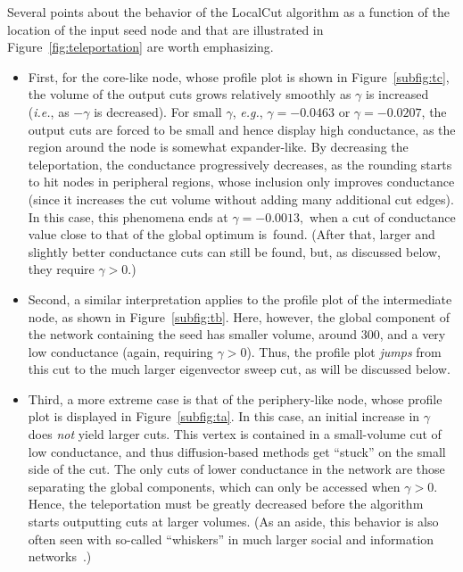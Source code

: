\documentclass[11pt]{article}
\begin{document}
Several points about the behavior of the \textsf{LocalCut} algorithm as a 
function of the location of the input seed node and that are illustrated in 
Figure~\ref{fig:teleportation} are worth emphasizing.
\begin{itemize}
\item
First, for the core-like node, whose profile plot is shown in 
Figure~\ref{subfig:tc}, the volume of the output cuts grows relatively 
smoothly as $\gamma$ is increased (\emph{i.e.}, as $-\gamma$ is decreased). 
For small $\gamma$, \emph{e.g.}, $\gamma=-0.0463$ or $\gamma=-0.0207$, the 
output cuts are forced to be small and hence display high conductance, as 
the region around the node is somewhat expander-like. 
By decreasing the teleportation, the conductance progressively decreases, 
as the rounding starts  to hit nodes in peripheral regions, whose inclusion only improves 
conductance (since it increases the cut volume without adding many 
additional cut edges).
In this case, this phenomena ends at $\gamma = -0.0013,$ when a cut 
of conductance value close to that of the global optimum is~found. 
(After that, larger and slightly better conductance cuts can still be found, 
but, as discussed below, they require $\gamma > 0$.)
\item
Second, a similar interpretation applies to the profile plot of the 
intermediate node, as shown in Figure~\ref{subfig:tb}. 
Here, however, the global component of the network containing the seed has 
smaller volume, around $300$, and a very low conductance (again, requiring 
$\gamma > 0$).
Thus, the profile plot \emph{jumps} from this cut to the much larger 
eigenvector sweep cut, as will be discussed below.
\item
Third, a more extreme case is that of the periphery-like node, whose profile 
plot is displayed in Figure~\ref{subfig:ta}. 
In this case, an initial increase in $\gamma$ does \emph{not} yield larger cuts.
This vertex is contained in a small-volume cut of low conductance, and thus
diffusion-based methods get ``stuck'' on the small side of the cut.
The only cuts of lower conductance in the network are those separating the 
global components, which can only be accessed when $\gamma> 0$. 
Hence, the teleportation must be greatly decreased before the algorithm 
starts outputting cuts at larger volumes.
(As an aside, this behavior is also often seen with so-called ``whiskers'' 
in much larger social and information 
networks~\cite{LLDM08_communities_CONF,LLDM09_communities_IM,LLM10_communities_CONF}.) 
\end{itemize}
\end{document}
